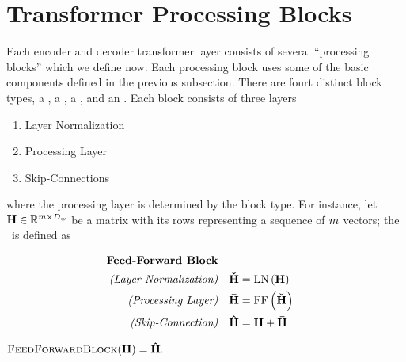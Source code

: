 \section{Transformer Processing Blocks}
Each encoder and decoder transformer layer consists of several
``processing blocks'' which we define now. Each processing block 
uses some of the basic components defined in the previous subsection.
%  
  There are fourt distinct block types, a \feedforwardblock, a \selfattentionblock, a \maskedselfattentionblock, and an \encoderattentionblock. 
  Each block consists of three layers
    \begin{enumerate}
        \item Layer Normalization
        \item Processing Layer
        \item Skip-Connections
    \end{enumerate}
    where the processing layer is determined by the block type. For instance,
    let $\mathbf{H} \in \mathbb{R}^{m \times D_{w}}$ be a
    matrix with its rows representing a sequence of $m$ vectors; the \feedforwardblock~is defined as \\
   {\centering \begin{minipage}{0.9\textwidth}
   \begin{align*}
      \textbf{Feed-Forward Block} & \\
       \textit{(Layer Normalization)} & & 
            \boldsymbol{\check{\mathbf{H}}} &
            =  \operatorname{LN}\left(\mathbf{H} \right) \\
            \textit{(Processing Layer)} &  & \boldsymbol{\bar{\mathbf{H}}} &= \operatorname{FF}\left(\boldsymbol{\check{\mathbf{H}}}\right)\\
    \textit{(Skip-Connection)} & & \boldsymbol{\hat{\mathbf{H}}} &= \mathbf{H} + \boldsymbol{\bar{\mathbf{H}}}\end{align*}
    \begin{center}$\textsc{FeedForwardBlock}(\mathbf{H})  =   \boldsymbol{\hat{\mathbf{H}}}.$ \end{center}
\end{minipage}}

